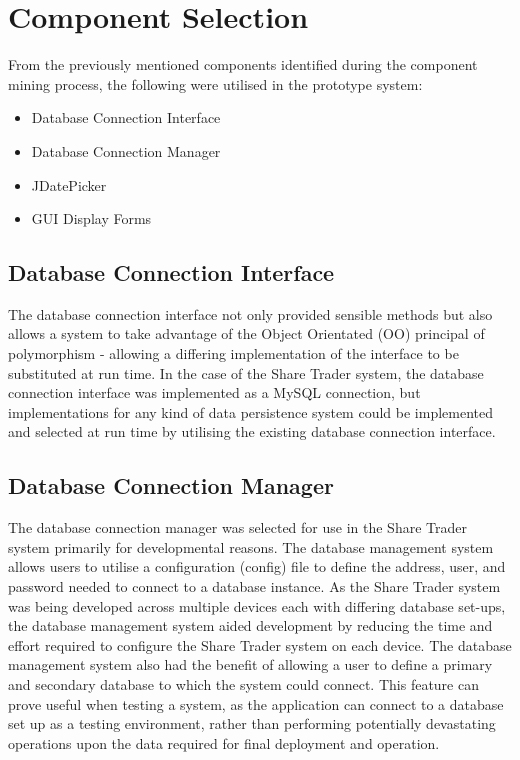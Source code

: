 \documentclass[12pt, a4paper,titlepage]{article}
\begin{document}
\section{Component Selection}
From the previously mentioned components identified  during the
component mining process, the following were utilised in the prototype system:

\begin{itemize}
\item Database Connection Interface
\item Database Connection Manager
\item JDatePicker
\item GUI Display Forms
\end{itemize}

\subsection{Database Connection Interface}
The database connection interface not only provided sensible methods but also
allows a system to take advantage of the Object Orientated (OO) principal of
polymorphism - allowing a differing implementation of the interface to be
substituted at run time. 
In the case of the Share Trader system, the database connection interface was
implemented as a MySQL connection, but implementations for any kind of data
persistence system could be implemented and selected at run time by
utilising the existing database connection interface.

\subsection{Database Connection Manager}
The database connection manager was selected for use in the Share Trader
system primarily for developmental reasons.
The database management system allows users to utilise a configuration
(config) file to define the address, user, and password needed to connect to a
database instance. 
As the Share Trader system was being developed across multiple
devices each with differing database set-ups, the database management system
aided development by reducing the time and effort required to configure the
Share Trader system on each device.
The database management system also had the benefit of allowing a user to
define a primary and secondary database to which the system could connect. 
This feature can prove useful when testing a system, as the application can
connect to a database set up as a testing environment, rather than performing
potentially devastating operations upon the data required for final deployment
and operation.
\end{document}
